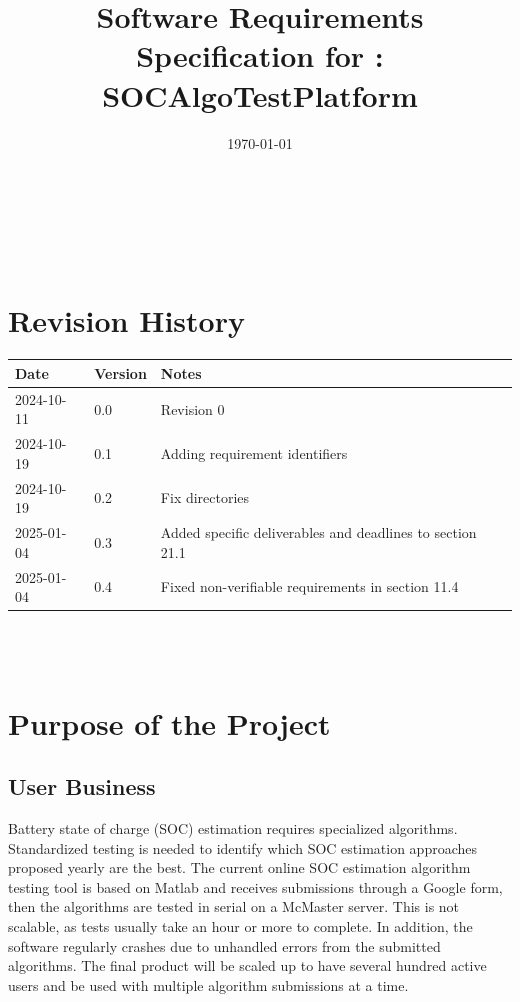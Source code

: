 \documentclass[12pt]{article}
\begin{document}
\title{Software Requirements Specification for \progname: SOCAlgoTestPlatform} 
\author{\authname}
\date{\today}
	
\maketitle

~\newpage


\tableofcontents

~\newpage

\section*{Revision History}

\begin{tabularx}{\textwidth}{p{3cm}p{2cm}X}
\toprule {\textbf{Date}} & {\textbf{Version}} & {\textbf{Notes}}\\
\midrule
2024-10-11 & 0.0 & Revision 0\\
2024-10-19 & 0.1 & Adding requirement identifiers \\
2024-10-19 & 0.2 & Fix directories \\
2025-01-04 & 0.3 & Added specific deliverables and deadlines to section 21.1 \\
2025-01-04 & 0.4 & Fixed non-verifiable requirements in section 11.4  \\
\bottomrule
\end{tabularx}

~\\

~\newpage
\section{Purpose of the Project}
\subsection{User Business}
Battery state of charge (SOC) estimation requires specialized algorithms. Standardized testing is needed to identify which SOC estimation approaches proposed yearly are the best. The current online SOC estimation algorithm testing tool is based on Matlab and receives submissions through a Google form, then the algorithms are tested in serial on a McMaster server. This is not scalable, as tests usually take an hour or more to complete. In addition, the software regularly crashes due to unhandled errors from the submitted algorithms. The final product will be scaled up to have several hundred active users and be used with multiple algorithm submissions at a time.
\end{document}
